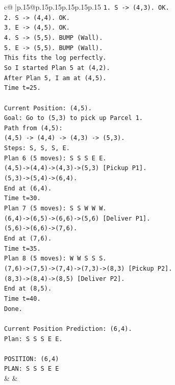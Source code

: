 \documentclass{article}
\begin{document}
{\begin{supertabular}{c@{$\;$}|p{.15\linewidth}@{}p{.15\linewidth}p{.15\linewidth}p{.15\linewidth}p{.15\linewidth}p{.15\linewidth}}
{{{\texttt{1. S {-}> (4,3). OK.} \\
\texttt{2. S {-}> (4,4). OK.} \\
\texttt{3. E {-}> (4,5). OK.} \\
\texttt{4. S {-}> (5,5). BUMP (Wall).} \\
\texttt{5. E {-}> (5,5). BUMP (Wall).} \\
\texttt{This fits the log perfectly.} \\
\texttt{So I started Plan 5 at (4,2).} \\
\texttt{After Plan 5, I am at (4,5).} \\
\texttt{Time t=25.} \\
\\ 
\texttt{Current Position: (4,5).} \\
\texttt{Goal: Go to (5,3) to pick up Parcel 1.} \\
\texttt{Path from (4,5):} \\
\texttt{(4,5) {-}> (4,4) {-}> (4,3) {-}> (5,3).} \\
\texttt{Steps: S, S, S, E.} \\
\texttt{Plan 6 (5 moves): S S S E E.} \\
\texttt{(4,5){-}>(4,4){-}>(4,3){-}>(5,3) {[}Pickup P1{]}.} \\
\texttt{(5,3){-}>(5,4){-}>(6,4).} \\
\texttt{End at (6,4).} \\
\texttt{Time t=30.} \\
\texttt{Plan 7 (5 moves): S S W W W.} \\
\texttt{(6,4){-}>(6,5){-}>(6,6){-}>(5,6) {[}Deliver P1{]}.} \\
\texttt{(5,6){-}>(6,6){-}>(7,6).} \\
\texttt{End at (7,6).} \\
\texttt{Time t=35.} \\
\texttt{Plan 8 (5 moves): W W S S S.} \\
\texttt{(7,6){-}>(7,5){-}>(7,4){-}>(7,3){-}>(8,3) {[}Pickup P2{]}.} \\
\texttt{(8,3){-}>(8,4){-}>(8,5) {[}Deliver P2{]}.} \\
\texttt{End at (8,5).} \\
\texttt{Time t=40.} \\
\texttt{Done.} \\
\\ 
\texttt{Current Position Prediction: (6,4).} \\
\texttt{Plan: S S S E E.} \\
\\ 
\texttt{POSITION: (6,4)} \\
\texttt{PLAN: S S S E E} \\
            }
        }
    }
    & & \\ \\


\end{supertabular}}
\end{document}
